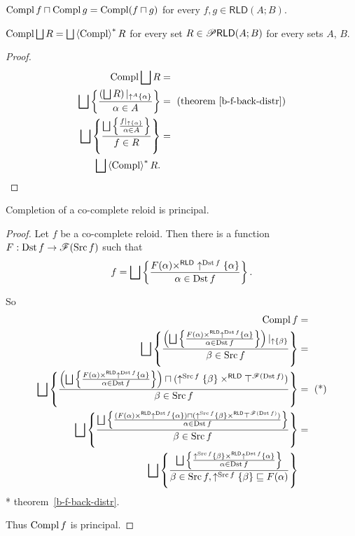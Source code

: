 \begin{conjecture}
$\operatorname{Compl} f\sqcap\operatorname{Compl} g=\operatorname{Compl}(f\sqcap g)$ for every $f,g\in\mathsf{RLD}(A;B)$.\end{conjecture}
\begin{thm}
$\operatorname{Compl}\bigsqcup R=\bigsqcup\left\langle \operatorname{Compl}\right\rangle ^{\ast}R$ for every set $R\in\mathscr{P}\mathsf{RLD}(A;B)$
for every sets $A$, $B$.\end{thm}
\begin{proof}
~
\begin{align*}
\operatorname{Compl}\bigsqcup R & =\\
\bigsqcup\left\{ \frac{\left(\bigsqcup R\right)|_{\uparrow^{A}\{\alpha\}}}{\alpha\in A}\right\} & =\text{ (theorem~\ref{b-f-back-distr})}\\
\bigsqcup\left\{ \frac{\bigsqcup\left\{ \frac{f|_{\uparrow \{\alpha\}}}{\alpha\in A}\right\}}{f\in R}\right\} & =\\
\bigsqcup\left\langle \operatorname{Compl}\right\rangle ^{\ast}R.
\end{align*}
\end{proof}
\begin{lem}
Completion of a co-complete reloid is principal.\end{lem}
\begin{proof}
Let $f$ be a co-complete reloid. Then there is a function $F:\operatorname{Dst} f\rightarrow\mathscr{F}(\operatorname{Src} f)$
such that
\[
f=\bigsqcup\left\{ \frac{F(\alpha)\times^{\mathsf{RLD}}\uparrow^{\operatorname{Dst} f}\{\alpha\}}{\alpha\in\operatorname{Dst} f}\right\}.
\]


So
\begin{align*}
\operatorname{Compl} f & =\\
\bigsqcup\left\{ \frac{\left(\bigsqcup\left\{ \frac{F(\alpha)\times^{\mathsf{RLD}}\uparrow^{\operatorname{Dst} f}\{\alpha\}}{\alpha\in\operatorname{Dst} f}\right\}\right)|_{\uparrow\{\beta\}}}{\beta\in\operatorname{Src} f}\right\} & =\\
\bigsqcup\left\{ \frac{\left(\bigsqcup\left\{ \frac{F(\alpha)\times^{\mathsf{RLD}}\uparrow^{\operatorname{Dst} f}\{\alpha\}}{\alpha\in\operatorname{Dst} f}\right\}\right)\sqcap(\uparrow^{\operatorname{Src} f}\{\beta\}\times^{\mathsf{RLD}}\top^{\mathscr{F}(\operatorname{Dst} f)})}{\beta\in\operatorname{Src} f}\right\} & =\text{ (*)}\\
\bigsqcup\left\{ \frac{\bigsqcup\left\{ \frac{(F(\alpha)\times^{\mathsf{RLD}}\uparrow^{\operatorname{Dst} f}\{\alpha\})\sqcap(\uparrow^{\operatorname{Src} f}\{\beta\}\times^{\mathsf{RLD}}\top^{\mathscr{F}(\operatorname{Dst} f)})}{\alpha\in\operatorname{Dst} f}\right\}}{\beta\in\operatorname{Src} f}\right\} & =\\
\bigsqcup\left\{ \frac{\bigsqcup\left\{ \frac{\uparrow^{\operatorname{Src} f}\{\beta\}\times^{\mathsf{RLD}}\uparrow^{\operatorname{Dst} f}\{\alpha\}}{\alpha\in\operatorname{Dst} f}\right\}}{\beta\in\operatorname{Src} f,\uparrow^{\operatorname{Src} f}\{\beta\}\sqsubseteq F(\alpha)}\right\}
\end{align*}
{*} theorem~\ref{b-f-back-distr}.

Thus $\operatorname{Compl} f$ is principal.\end{proof}
